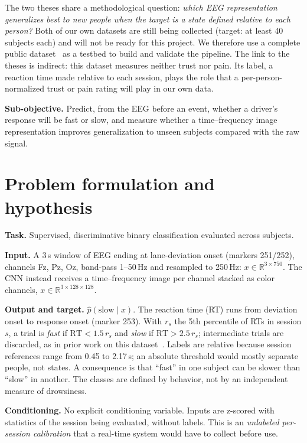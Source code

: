 \documentclass[conference]{IEEEtran}
\begin{document}
The two theses share a methodological question: \emph{which EEG representation generalizes best to new people when the target is a state defined relative to each person?} Both of our own datasets are still being collected (target: at least 40 subjects each) and will not be ready for this project. We therefore use a complete public dataset~\cite{cao2019} as a testbed to build and validate the pipeline. The link to the theses is indirect: this dataset measures neither trust nor pain. Its label, a reaction time made relative to each session, plays the role that a per-person-normalized trust or pain rating will play in our own data.

\textbf{Sub-objective.} Predict, from the EEG before an event, whether a driver's response will be fast or slow, and measure whether a time--frequency image representation improves generalization to unseen subjects compared with the raw signal.

\section{Problem formulation and hypothesis}
\textbf{Task.} Supervised, discriminative binary classification evaluated across subjects.

\textbf{Input.} A 3\,s window of EEG ending at lane-deviation onset (markers 251/252), channels Fz, Pz, Oz, band-pass 1--50\,Hz and resampled to 250\,Hz: $x\in\mathbb{R}^{3\times750}$. The CNN instead receives a time--frequency image per channel stacked as color channels, $x\in\mathbb{R}^{3\times128\times128}$.

\textbf{Output and target.} $\hat p(\text{slow}\mid x)$. The reaction time (RT) runs from deviation onset to response onset (marker 253). With $r_{s}$ the 5th percentile of RTs in session $s$, a trial is \emph{fast} if $\mathrm{RT}<1.5\,r_s$ and \emph{slow} if $\mathrm{RT}>2.5\,r_s$; intermediate trials are discarded, as in prior work on this dataset~\cite{zhou2024,atilla2021}. Labels are relative because session references range from 0.45 to 2.17\,s; an absolute threshold would mostly separate people, not states. A consequence is that ``fast'' in one subject can be slower than ``slow'' in another. The classes are defined by behavior, not by an independent measure of drowsiness.

\textbf{Conditioning.} No explicit conditioning variable. Inputs are z-scored with statistics of the session being evaluated, without labels. This is an \emph{unlabeled per-session calibration} that a real-time system would have to collect before use.
\end{document}
